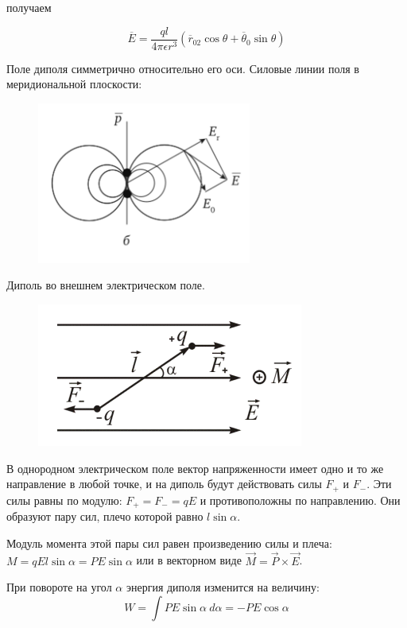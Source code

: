 получаем

$$\overline E=\frac{ql}{4\pi\epsilon r^3}(\overline r_02\cos\theta+\overline\theta_0\sin\theta)$$

Поле диполя симметрично относительно его оси. Силовые линии поля в меридиональной плоскости:

\begin{figure}[h]
    \centering
    \includegraphics[width=0.3\linewidth]{imgs/q20i1.png}
\end{figure}

Диполь во внешнем электрическом поле.

\begin{figure}[h]
    \centering
    \includegraphics[width=0.3\linewidth]{imgs/q20i2.png}
\end{figure}

В однородном электрическом поле вектор напряженности имеет одно и то же направление в любой точке, 
и на диполь будут действовать силы $F_+$ и $F_-$. Эти силы равны по модулю: $F_+=F_-=qE$ и противоположны по направлению. 
Они образуют пару сил, плечо которой равно $l\sin\alpha$. 

Модуль момента этой пары сил равен произведению силы и плеча: $M=qEl\sin\alpha=PE\sin\alpha$ или в векторном виде 
$\vec M=\vec P\times\vec E$.

При повороте на угол $\alpha$ энергия диполя изменится на величину:
$$W=\int PE\sin\alpha\ d\alpha=-PE\cos\alpha$$
